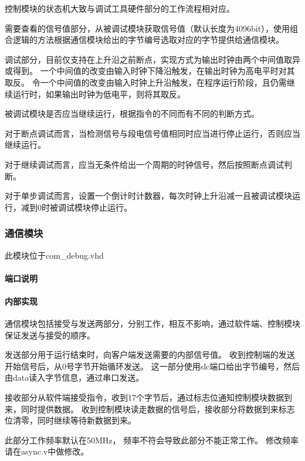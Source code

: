                 控制模块的状态机大致与调试工具硬件部分的工作流程相对应。

                需要查看的信号值部分，从被调试模块获取信号值（默认长度为4096bit），使用组合逻辑的方法根据通信模块给出的字节编号选取对应的字节提供给通信模块。

                调试部分，目前仅支持在上升沿之前断点，实现方式为输出时钟由两个中间值取异或得到。%
                一个中间值的改变由输入时钟下降沿触发，在输出时钟为高电平时对其取反。%
                令一个中间值的改变由输入时钟上升沿触发，在程序运行阶段，且仍需继续运行时，如果输出时钟为低电平，则将其取反。

                被调试模块是否应当继续运行，根据指令的不同而有不同的判断方式。

                对于断点调试而言，当检测信号与段电信号值相同时应当进行停止运行，否则应当继续运行。

                对于继续调试而言，应当无条件给出一个周期的时钟信号，然后按照断点调试判断。

                对于单步调试而言，设置一个倒计时计数器，每次时钟上升沿减一且被调试模块运行，减到0时被调试模块停止运行。

        \subsubsection{通信模块}
            此模块位于com\_debug.vhd

            \paragraph{端口说明}
            \mbox{}

                

            \paragraph{内部实现}
            \mbox{}

                通信模块包括接受与发送两部分，分别工作，相互不影响，通过软件端、控制模块保证发送与接受的顺序。

                发送部分用于运行结束时，向客户端发送需要的内部信号值。%
                收到控制端的发送开始信号后，从0号字节开始循环发送。%
                这一部分使用slc端口给出字节编号，然后由data读入字节信息，通过串口发送。

                接收部分从软件端接受指令，收到17个字节后，通过标志位通知控制模块数据到来，同时提供数据。%
                收到控制模块读走数据的信号后，接收部分将数据到来标志位清零，同时继续等待新数据到来。

                此部分工作频率默认在50MHz，%
                频率不符会导致此部分不能正常工作。%
                修改频率请在async.v中做修改。

